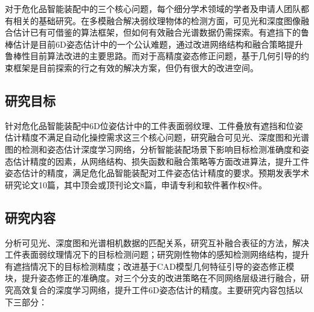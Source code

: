 \documentclass[12pt]{article}
\begin{document}
对于危化品智能装配中的三个核心问题，每个细分学术领域的学者及申请人团队都有相关的基础研究。在多模融合解决弱纹理物体的检测方面，可见光和深度图像融合估计已有可借鉴的算法框架，但如何有效融合光谱数据仍需探索。有遮挡下的鲁棒估计是目前6D姿态估计中的一个公认难题，通过改进网络结构和融合策略提升鲁棒性目前算法改进的主要思路。而对于高精度姿态修正问题，基于几何引导的约束框架是目前探索的行之有效的解决方案，但仍有很大的改进空间。

{


}



\subsection{研究目标}

针对危化品智能装配中6D位姿估计中的工件表面弱纹理、工件叠放有遮挡和位姿估计精度不满足自动化操控需求这三个核心问题，研究融合可见光、深度图和光谱图的检测和姿态估计深度学习网络，分析智能装配场景下影响目标检测准确度和姿态估计精度的因素，从网络结构、损失函数和融合策略等方面改进算法，提升工件姿态估计的精度，满足危化品智能装配对工件姿态估计精度的要求。预期发表学术研究论文10篇，其中顶会或顶刊论文8篇，申请专利和软件著作权8件。

\subsection{研究内容}

分析可见光、深度图和光谱相机数据的匹配关系，研究互补融合表征的方法，解决工件表面弱纹理情况下的目标检测问题；研究刚性物体的感知检测网络结构，提升有遮挡情况下的目标检测精度；改进基于CAD模型几何特征引导的姿态修正模块，提升姿态修正的准确度。对三个分支的改进策略在不同网络层级进行融合，研究高效复合的深度学习网络，提升工件6D姿态估计的精度。主要研究内容包括以下三部分：
\end{document}
